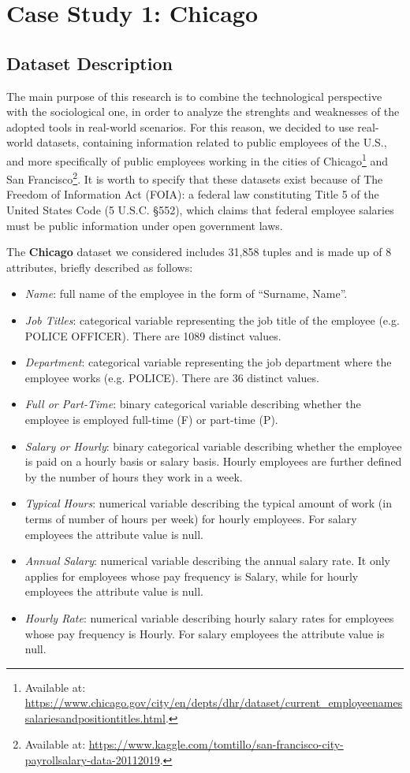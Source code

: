 \section{Case Study 1: Chicago}
\subsection{Dataset Description}
The main purpose of this research is to combine the technological perspective with the sociological one, in order to analyze the strenghts and weaknesses of the adopted tools in real-world scenarios. For this reason, we decided to use real-world datasets, containing information related to public employees of the U.S., and more specifically of public employees working in the cities of Chicago\footnote{Available at: \url{https://www.chicago.gov/city/en/depts/dhr/dataset/current_employeenamessalariesandpositiontitles.html}.} and San Francisco\footnote{Available at: \url{https://www.kaggle.com/tomtillo/san-francisco-city-payrollsalary-data-20112019}.}. It is worth to specify that these datasets exist because of The Freedom of Information Act (FOIA): a federal law constituting Title 5 of the United States Code (5 U.S.C. \S 552), which claims that federal employee salaries must be public information under open government laws.

The \textbf{Chicago} dataset we considered includes 31,858 tuples and is made up of 8 attributes, briefly described as follows:
\begin{itemize}
\item \textit{Name}: full name of the employee in the form of ``Surname, Name''.
\item \textit{Job Titles}: categorical variable representing the job title of the employee (e.g. POLICE OFFICER). There are 1089 distinct values.
\item \textit{Department}: categorical variable representing the job department where the employee works (e.g. POLICE). There are 36 distinct values.
\item \textit{Full or Part-Time}: binary categorical variable describing whether the employee is employed full-time (F) or part-time (P).
\item \textit{Salary or Hourly}: binary categorical variable describing whether the employee is paid on a hourly basis or salary basis. Hourly employees are further defined by the number of hours they work in a week.
\item \textit{Typical Hours}: numerical variable describing the typical amount of work (in terms of number of hours per week) for hourly employees. For salary employees the attribute value is null.
\item \textit{Annual Salary}: numerical variable describing the annual salary rate. It only applies for employees whose pay frequency is Salary, while for hourly employees the attribute value is null.
\item \textit{Hourly Rate}: numerical variable describing hourly salary rates for employees whose pay frequency is Hourly. For salary employees the attribute value is null.
\end{itemize}


